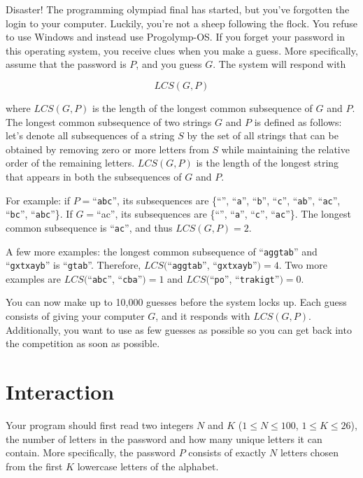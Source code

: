 
Disaster! The programming olympiad final has started, but you've forgotten the login to your computer.
Luckily, you're not a sheep following the flock. You refuse to use Windows and instead use Progolymp-OS.
If you forget your password in this operating system, you receive clues when you make a guess.
More specifically, assume that the password is $P$, and you guess $G$. The system will respond with

$$LCS(G,P)$$

where $LCS(G,P)$ is the length of the longest common subsequence of $G$ and $P$. The longest common
subsequence of two strings $G$ and $P$ is defined as follows: let's denote all subsequences of
a string $S$ by the set of all strings that can be obtained by removing zero or more letters
from $S$ while maintaining the relative order of the remaining letters. $LCS(G,P)$ is the length of the longest
string that appears in both the subsequences of $G$ and $P$.

For example: if $P=$``\texttt{abc}'', its subsequences are \{``'', ``\texttt{a}'', ``\texttt{b}'', ``\texttt{c}'',
``\texttt{ab}'', ``\texttt{ac}'', ``\texttt{bc}'', ``\texttt{abc}''\}.
If $G=$``ac'', its subsequences are \{``'', ``\texttt{a}'', ``\texttt{c}'', ``\texttt{ac}''\}. The longest common
subsequence is ``\texttt{ac}'', and thus $LCS(G,P)=2$.

A few more examples: the longest common subsequence of ``\texttt{aggtab}'' and ``\texttt{gxtxayb}'' is
``\texttt{gtab}''. Therefore, $LCS($``\texttt{aggtab}'', ``\texttt{gxtxayb}''$) = 4$. Two more examples are
$LCS($``\texttt{abc}'', ``\texttt{cba}''$) = 1$ and $LCS($``\texttt{po}'', ``\texttt{trakigt}''$) = 0$.

You can now make up to 10,000 guesses before the system locks up. Each guess consists of giving your computer $G$,
and it responds with $LCS(G,P)$. Additionally, you want to use as few guesses as possible so you can get back into
the competition as soon as possible.

\section*{Interaction}
Your program should first read two integers $N$ and $K$ ($1 \leq N \leq 100$, $1 \leq K \leq 26$), the number of
letters in the password and
how many unique letters it can contain.
More specifically, the password $P$ consists of exactly $N$ letters chosen from the first $K$ lowercase letters
of the alphabet.

